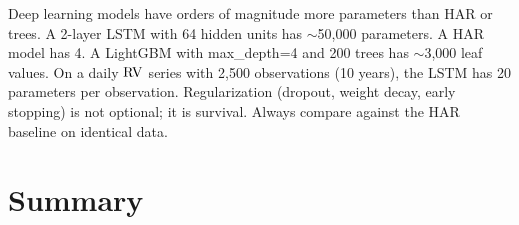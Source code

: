 \begin{warning}
Deep learning models have orders of magnitude more parameters than HAR or trees.
A 2-layer LSTM with 64 hidden units has $\sim$50,000 parameters.
A HAR model has 4.
A LightGBM with max\_depth=4 and 200 trees has $\sim$3,000 leaf values.
On a daily $\operatorname{RV}$ series with 2,500 observations (10 years), the LSTM has 20 parameters per observation.
Regularization (dropout, weight decay, early stopping) is not optional; it is survival.
Always compare against the HAR baseline on identical data.
\end{warning}


\section{Summary}\label{sec:dl:summary}


